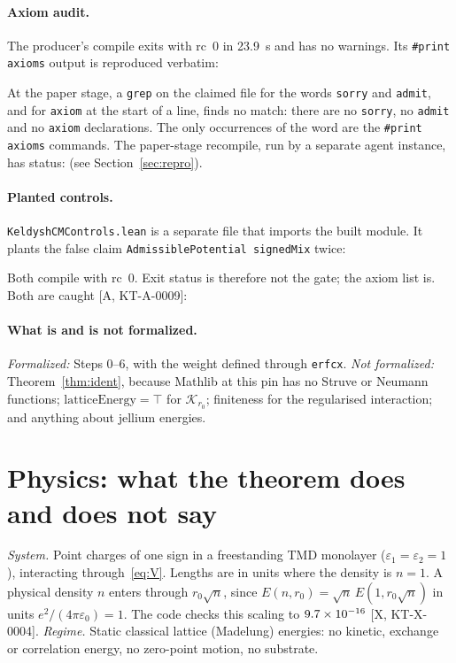 \documentclass[11pt]{article}
\theoremstyle{remark}
\newcommand{\tier}[1]{\textsf{[#1]}}
\newcommand{\lean}[1]{\texttt{#1}}
\begin{document}





\paragraph{Axiom audit.} The producer's compile exits with rc~0 in 23.9~s and has no warnings. Its \lean{\#print axioms}
output is reproduced verbatim:

At the paper stage, a \texttt{grep} on the claimed file for the words \lean{sorry} and \lean{admit}, and for
\lean{axiom} at the start of a line, finds no match: there are no
\lean{sorry}, no \lean{admit} and no \lean{axiom} declarations. The only occurrences of the word are the
\lean{\#print axioms} commands. The paper-stage recompile, run by
a separate agent instance, has status: \textbf{\KTRecompileStatus} (see Section~\ref{sec:repro}).

\paragraph{Planted controls.} \texttt{KeldyshCMControls.lean} is a separate file that imports the built module.
It plants the false claim \lean{AdmissiblePotential signedMix} twice:

Both compile with rc~0. Exit status is therefore not the gate; the axiom list is. Both are caught
\tier{A, KT-A-0009}:


\paragraph{What is and is not formalized.} \emph{Formalized:} Steps 0--6, with the weight defined through
\lean{erfcx}. \emph{Not formalized:} Theorem~\ref{thm:ident}, because Mathlib at this pin has no Struve or Neumann
functions; $\mathrm{latticeEnergy}=\top$ for $\mathcal K_{r_0}$; finiteness for the regularised interaction; and anything
about jellium energies.

\section{Physics: what the theorem does and does not say}\label{sec:phys}
\emph{System.} Point charges of one sign in a freestanding TMD monolayer ($\varepsilon_1=\varepsilon_2=1$), interacting
through~\eqref{eq:V}. Lengths are in units where the density is $n=1$. A physical density $n$ enters through
$r_0\sqrt n$, since $E(n,r_0)=\sqrt n\,E(1,r_0\sqrt n)$ in units $e^2/(4\pi\varepsilon_0)=1$. The code checks this
scaling to $9.7\times10^{-16}$ \tier{X, KT-X-0004}. \emph{Regime.} Static classical lattice (Madelung) energies: no
kinetic, exchange or correlation energy, no zero-point motion, no substrate.
\end{document}
